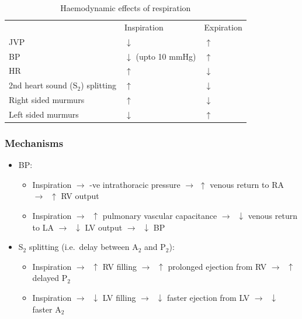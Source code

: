 \documentclass[
  12pt,
]{memoir}
\providecommand{\tightlist}{%
  \setlength{\itemsep}{0pt}\setlength{\parskip}{0pt}}
\begin{document}
\renewcommand{\arraystretch}{1.5}
\begin{table}[h!]
\centering
\begin{tabular}{l l l}
\cellcolor{violet!60}\color{white} &
\cellcolor{violet!60}\color{white}Inspiration &
\cellcolor{violet!60}\color{white}Expiration \\
JVP & $\downarrow$ & $\uparrow$ \\
BP & $\downarrow$ (upto 10 mmHg) & $\uparrow$ \\
HR & $\uparrow$ & $\downarrow$ \\
2nd heart sound (S$_2$) splitting & $\uparrow$ & $\downarrow$ \\
Right sided murmurs & $\uparrow$ & $\downarrow$ \\
Left sided murmurs & $\downarrow$ & $\uparrow$ \\
\end{tabular}
\vspace{3mm}\caption{Haemodynamic effects of respiration}
\label{table:haemo-resp.txt}
\end{table}

\hypertarget{mechanisms}{%
\subsubsection{Mechanisms}\label{mechanisms}}

\begin{itemize}
\tightlist
\item
  BP:

  \begin{itemize}
  \tightlist
  \item
    Inspiration \(\rightarrow\) -ve intrathoracic pressure
    \(\rightarrow\) \(\uparrow\) venous return to RA
    \(\rightarrow\;\;\uparrow\) RV output
  \item
    Inspiration \(\rightarrow\;\;\uparrow\) pulmonary vascular
    capacitance \(\rightarrow\;\;\downarrow\) venous return to LA
    \(\rightarrow\;\;  \downarrow\) LV output
    \(\rightarrow\;\;\downarrow\) BP
  \end{itemize}
\item
  S\(_2\) splitting (i.e.~delay between A\(_2\) and P\(_2\)):

  \begin{itemize}
  \tightlist
  \item
    Inspiration \(\rightarrow\;\;\uparrow\) RV filling
    \(\rightarrow\;\;  \uparrow\) prolonged ejection from RV
    \(\rightarrow\;\;\uparrow\) delayed P\(_2\)
  \item
    Inspiration \(\rightarrow\;\;\downarrow\) LV filling
    \(\rightarrow\;\;  \downarrow\) faster ejection from LV
    \(\rightarrow\;\;\downarrow\) faster A\(_2\)
  \end{itemize}
\end{itemize}
\end{document}
